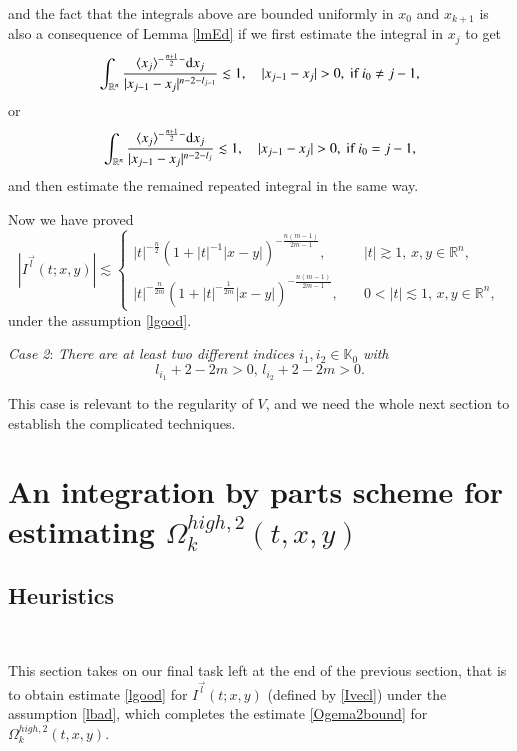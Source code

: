 \documentclass[11pt,reqno]{amsart}
\def\d{{\rm d}}
\numberwithin{equation}{section}
\theoremstyle{definition}
\begin{document}
and the fact that the integrals above are bounded uniformly in $x_0$ and $x_{k+1}$ is also a consequence of Lemma \ref{lmEd} if we first estimate the integral in $x_j$ to get
\begin{equation*}
	\int_{\mathbb{R}^n}\frac{\langle x_j\rangle^{-\frac{n+1}{2}-}\d x_j}{|x_{j-1}-x_j|^{n-2-l_{j-1}}}\lesssim1,\quad|x_{j-1}-x_j|>0,~\text{if}~i_0\neq j-1,
\end{equation*}
or
\begin{equation*}
	\int_{\mathbb{R}^n}\frac{\langle x_j\rangle^{-\frac{n+1}{2}-}\d x_j}{|x_{j-1}-x_j|^{n-2-l_j}}\lesssim1,\quad|x_{j-1}-x_j|>0,~\text{if}~i_0=j-1,
\end{equation*}
and then estimate the remained repeated integral in the same way.

Now we have proved
\begin{equation*}\label{Iest}
	|I^{\vec{l}}(t;x,y)|\lesssim\begin{cases}
		|t|^{-\frac{n}{2}}(1+|t|^{-1}|x-y|)^{-\frac{n(m-1)}{2m-1}},\quad&|t|\gtrsim1,\,x,y\in\mathbb{R}^n,\\
		|t|^{-\frac{n}{2m}}(1+|t|^{-\frac{1}{2m}}|x-y|)^{-\frac{n(m-1)}{2m-1}},\quad&0<|t|\lesssim1,\,x,y\in\mathbb{R}^n,
	\end{cases}
\end{equation*}
under the assumption \eqref{lgood}.

\noindent\emph{Case 2}: \textit{There are at least two different indices $i_1,i_2\in\mathbb{K}_0$ with}
\begin{equation}\label{lbad}
	l_{i_1}+2-2m>0,\,l_{i_2}+2-2m>0.
\end{equation}

This case is relevant to the regularity of $V$, and we need the whole next section to establish the complicated techniques.


\section{An integration by parts scheme for estimating $\Omega_k^{high,2}(t,x,y)$}\label{section5}



\subsection{Heuristics}\label{section5.1}\

This section takes on our final task left at the end of the previous section, that is to obtain estimate \eqref{lgood} for $I^{\vec{l}}(t;x,y)$ (defined by \eqref{Ivecl}) under the assumption \eqref{lbad}, which completes the estimate \eqref{Ogema2bound} for $\Omega_k^{high,2}(t,x,y)$.
\end{document}
